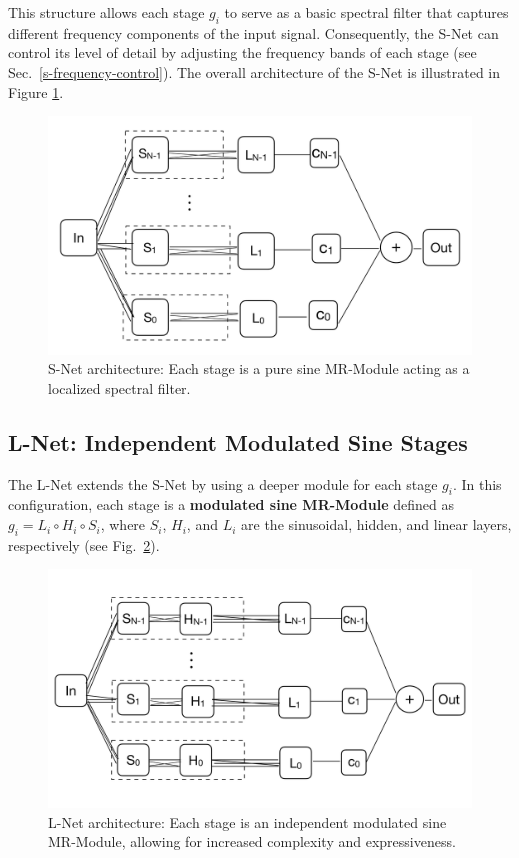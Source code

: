 This structure allows each stage \( g_i \) to serve as a basic spectral filter that captures different frequency components of the input signal. Consequently, the S-Net can control its level of detail by adjusting the frequency bands of each stage (see Sec.~\ref{s-frequency-control}). The overall architecture of the S-Net is illustrated in Figure \ref{f:s-net}.

\begin{figure}[!h]
\centering
\includegraphics[width=0.58\linewidth]{img/ch4/snet.pdf}
\caption{S-Net architecture: Each stage is a pure sine MR-Module acting as a localized spectral filter.}
\label{f:s-net}
\end{figure}

\subsection{L-Net: Independent Modulated Sine Stages}
\label{s-lnet}

The L-Net extends the S-Net by using a deeper module for each stage \( g_i \). In this configuration, each stage is a \textbf{modulated sine MR-Module} defined as \( g_i = L_i \circ H_i \circ S_i \), where \( S_i \), \( H_i \), and \( L_i \) are the sinusoidal, hidden, and linear layers, respectively (see Fig.~\ref{f:l-net}).

\begin{figure}[!h]
    \centering
    \includegraphics[width=0.7\linewidth]{img/ch4/lnet.pdf}
    \caption{L-Net architecture: Each stage is an independent modulated sine MR-Module, allowing for increased complexity and expressiveness.}
    \label{f:l-net}
\end{figure}

